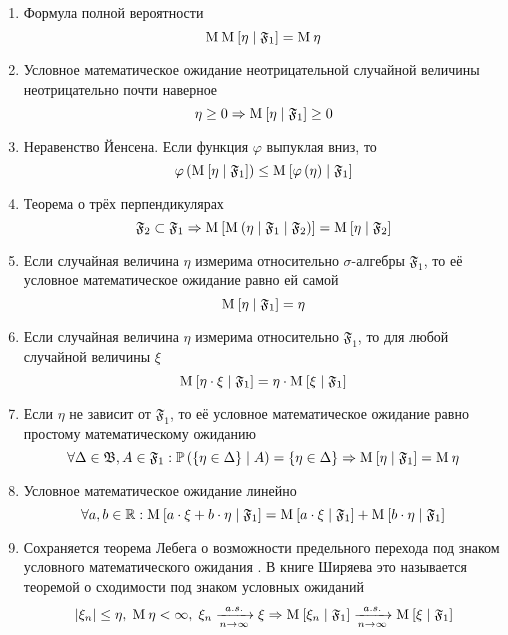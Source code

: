 \begin{enumerate}[label=\Roman*]
    \item\label{conditionalExpectationProperty:totalProbability}
        Формула полной вероятности \cite[стр.~144]{BorovkovMS}
        $$\operatorname{M}_{} \operatorname{M}_{} \left[  \eta \;\middle|\; \mathfrak{F}_1  \right] = \operatorname{M}_{} \eta$$
    \item Условное математическое ожидание неотрицательной случайной величины
        неотрицательно почти наверное
        $$\eta \ge 0
            \Rightarrow \operatorname{M}_{} \left[  \eta \;\middle|\; \mathfrak{F}_1  \right] \ge 0$$
    \item\label{conditionalExpectationProperty:Jensen}
        Неравенство Йенсена. Если функция $\varphi$ выпуклая вниз, то
        $$\varphi\left( \operatorname{M}_{} \left[  \eta \;\middle|\; \mathfrak{F}_1  \right] \right)
            \le \operatorname{M}_{} \left[ \varphi\left( \eta \right) \;\middle|\; \mathfrak{F}_1 \right]$$
    \item Теорема о трёх перпендикулярах
        $$\mathfrak{F}_2 \subset \mathfrak{F}_1 \Rightarrow
            \operatorname{M}_{} \left[  \operatorname{M}_{} \left( \eta \;\middle|\; \mathfrak{F}_1
                \;\middle|\; \mathfrak{F}_2 \right) \right]
            = \operatorname{M}_{} \left[  \eta \;\middle|\; \mathfrak{F}_2  \right]$$
    \item\label{conditionalExpectationProperty:measurableRandomVariable}
        Если случайная величина $\eta$ измерима
        относительно $\sigma$-алгебры $\mathfrak{F}_1$,
        то её условное математическое ожидание равно ей самой
        $$\operatorname{M}_{} \left[  \eta \;\middle|\; \mathfrak{F}_1  \right] = \eta$$
    \item Если случайная величина $\eta$ измерима
        относительно $\mathfrak{F}_1$, то для любой случайной величины $\xi$
        $$\operatorname{M}_{} \left[  \eta \cdot \xi \;\middle|\; \mathfrak{F}_1  \right]
            = \eta \cdot \operatorname{M}_{} \left[  \xi \;\middle|\; \mathfrak{F}_1  \right]$$
    \item Если $\eta$ не зависит от $\mathfrak{F}_1$,
        то её условное математическое ожидание
        равно простому математическому ожиданию
        $$\forall \Delta \in \mathfrak{B}, A \in \mathfrak{F}_1:
            \mathbb{P}\left(  \left\{ \eta \in \Delta \right\} \;\middle|\; A \right)
                = \left\{ \eta \in \Delta \right\}
            \Rightarrow \operatorname{M}_{} \left[  \eta \;\middle|\; \mathfrak{F}_1  \right]
                = \operatorname{M}_{} \eta$$
    \item\label{conditionalExpectationProperty:linearity}
        Условное математическое ожидание линейно
        $$\forall a, b \in \mathbb{R}:
            \operatorname{M}_{} \left[ a \cdot \xi + b \cdot \eta \;\middle|\; \mathfrak{F}_1 \right]
                = \operatorname{M}_{} \left[ a \cdot \xi \;\middle|\; \mathfrak{F}_1 \right]
                    + \operatorname{M}_{} \left[ b \cdot \eta \;\middle|\; \mathfrak{F}_1 \right]$$
    \item Сохраняется теорема Лебега о возможности предельного перехода
        под знаком условного математического ожидания
        \cite[стр.~302]{KolmogorovFA}.
        В книге Ширяева это называется теоремой о сходимости
        под знаком условных ожиданий \cite[стр.~272]{Shiryayev1}
        $$\left|\xi_n\right| \le \eta,
            \;\operatorname{M}_{} \eta < \infty,
            \;\xi_n \xrightarrow[n\to\infty]{a.s.} \xi
            \Rightarrow
            \operatorname{M}_{} \left[ \xi_n \;\middle|\; \mathfrak{F}_1 \right]
                \xrightarrow[n\to\infty]{a.s.} \operatorname{M}_{} \left[ \xi \;\middle|\; \mathfrak{F}_1 \right]$$
\end{enumerate}

